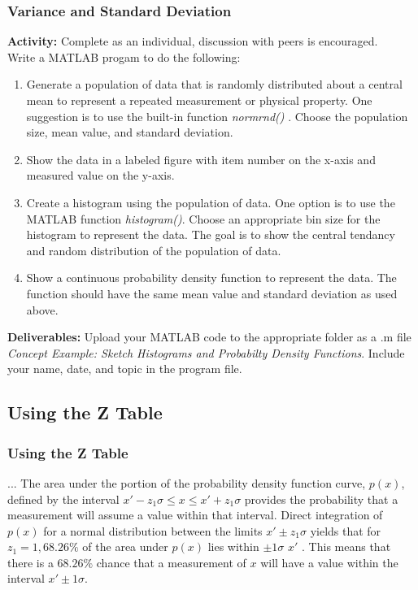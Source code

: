 \documentclass[fleqn]{ltx-talk} %
\newcommand{\sectionIIsubsectionIItitle}{Variance and Standard Deviation}
\newcommand{\sectionIIsubsectionIIItitle}{Using the Z Table}
\begin{document}
			\begin{frame} \scriptsize
				\frametitle{\sectionIIsubsectionIItitle}

				\bigskip
\textbf{Activity:} Complete as an individual, discussion with peers is encouraged.\\
      Write a MATLAB progam to do the following:
			\begin{enumerate}
		    \item Generate a population of data that is randomly distributed about a central mean to represent a repeated measurement or physical property. One suggestion is to use the built-in function {\itshape normrnd() }. Choose the population size, mean value, and standard deviation.
        \item Show the data in a labeled figure with item number on the x-axis and measured value on the y-axis.  
				\item Create a histogram using the population of data. One option is to use the MATLAB function {\itshape histogram()}. Choose an appropriate bin size for the histogram to represent the data. The goal is to show the central tendancy and random distribution of the population of data.
		    \item Show a continuous probability density function to represent the data. The function should have the same mean value and standard deviation as used above.
      	\end{enumerate}

		\textbf{Deliverables:} Upload your MATLAB code to the appropriate folder as a .m file {\itshape Concept Example: Sketch Histograms and Probabilty Density Functions}. Include your name, date, and topic in the program file.	

			\end{frame}

		\subsection{\sectionIIsubsectionIIItitle}\label{sectionIIsubsectionIII}

			\begin{frame}
				\frametitle{\sectionIIsubsectionIIItitle}

				... The area under the portion of the probability density function curve, $p(x)$, defined by the interval $x'-z_1\sigma \leq x \leq x' +z_1\sigma$ provides the probability that a measurement will assume a value within that interval. Direct integration of $p(x)$ for a normal
				distribution between the limits $x'\pm z_1\sigma$ yields that for $z_1=1, 68.26\%$ of the area under $p(x)$ lies
				within $\pm 1\sigma$   $x'$ . This means that there is a $68.26\%$ chance that a measurement of $x$ will have a
				value within the interval $x'\pm 1\sigma$.
			
			\end{frame}		
\end{document}
